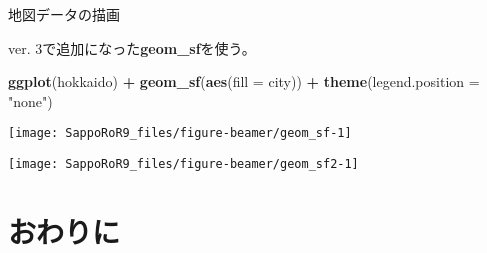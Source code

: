 \documentclass[ignorenonframetext,]{beamer}
\newenvironment{Shaded}{\begin{snugshade}}{\end{snugshade}}
\newcommand{\KeywordTok}[1]{\textcolor[rgb]{0.13,0.29,0.53}{\textbf{#1}}}
\newcommand{\DataTypeTok}[1]{\textcolor[rgb]{0.13,0.29,0.53}{#1}}
\newcommand{\StringTok}[1]{\textcolor[rgb]{0.31,0.60,0.02}{#1}}
\newcommand{\OperatorTok}[1]{\textcolor[rgb]{0.81,0.36,0.00}{\textbf{#1}}}
\newcommand{\NormalTok}[1]{#1}
\let\oldShaded\Shaded
\let\endoldShaded\endShaded
\renewenvironment{Shaded}{\footnotesize\oldShaded}{\endoldShaded}
\begin{document}
\begin{frame}[fragile]{地図データの描画}

ver. 3で追加になった\textbf{geom\_sf}を使う。

\begin{Shaded}
\begin{Highlighting}[]
\KeywordTok{ggplot}\NormalTok{(hokkaido) }\OperatorTok{+}\StringTok{ }\KeywordTok{geom_sf}\NormalTok{(}\KeywordTok{aes}\NormalTok{(}\DataTypeTok{fill =}\NormalTok{ city)) }\OperatorTok{+}
\StringTok{  }\KeywordTok{theme}\NormalTok{(}\DataTypeTok{legend.position =} \StringTok{"none"}\NormalTok{)}
\end{Highlighting}
\end{Shaded}

\texttt{[image: SappoRoR9\_files/figure-beamer/geom\_sf-1]}

\end{frame}

\begin{frame}[fragile]

\begin{Shaded}
\end{Shaded}

\texttt{[image: SappoRoR9\_files/figure-beamer/geom\_sf2-1]}

\end{frame}

\section{おわりに}
\end{document}
